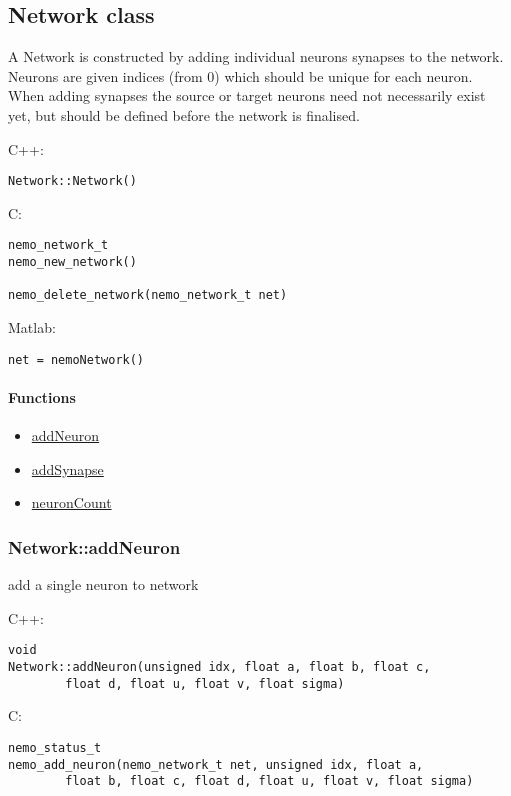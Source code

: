 \subsection{Network class}
\label{Network}
A Network is constructed by adding individual neurons synapses to the network. Neurons are given indices (from 0) which should be unique for each neuron. When adding synapses the source or target neurons need not necessarily exist yet, but should be defined before the network is finalised.

\noindent C++:
\begin{lstlisting}[aboveskip=2pt]
Network::Network()
\end{lstlisting}

\noindent C:
\begin{lstlisting}[aboveskip=2pt]
nemo_network_t
nemo_new_network()
 
nemo_delete_network(nemo_network_t net)
\end{lstlisting}

\noindent Matlab:
\begin{lstlisting}[aboveskip=2pt]
net = nemoNetwork()
\end{lstlisting}
\paragraph{Functions}
\begin{itemize}
\item \hyperref[fn: addNeuron]{addNeuron}
\item \hyperref[fn: addSynapse]{addSynapse}
\item \hyperref[fn: neuronCount]{neuronCount}
\end{itemize}
\clearpage
\subsubsection*{Network::addNeuron}
\label{fn: addNeuron}
add a single neuron to network


\noindent C++:
\begin{lstlisting}[aboveskip=2pt]
void
Network::addNeuron(unsigned idx, float a, float b, float c, 
        float d, float u, float v, float sigma)
\end{lstlisting}

\noindent C:
\begin{lstlisting}[aboveskip=2pt]
nemo_status_t
nemo_add_neuron(nemo_network_t net, unsigned idx, float a, 
        float b, float c, float d, float u, float v, float sigma)
\end{lstlisting}

